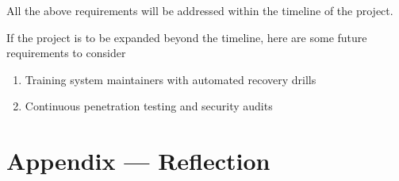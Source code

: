 \documentclass{article}
\begin{document}
All the above requirements will be addressed within the timeline of the project.


If the project is to be expanded beyond the timeline, here are some future requirements to consider
\begin{enumerate}
    \item Training system maintainers with automated recovery drills
    \item Continuous penetration testing and security audits
\end{enumerate}

\newpage{}

\section*{Appendix --- Reflection}


\end{document}
